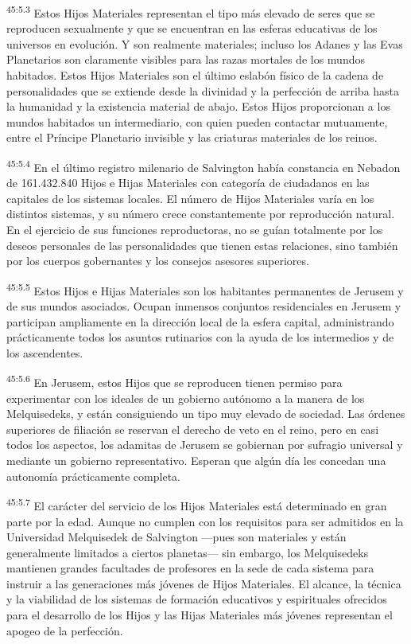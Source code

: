 \par
\textsuperscript{45:5.3} Estos Hijos Materiales representan el tipo más elevado de seres que se reproducen sexualmente y que se encuentran en las esferas educativas de los universos en evolución. Y son realmente materiales; incluso los Adanes y las Evas Planetarios son claramente visibles para las razas mortales de los mundos habitados. Estos Hijos Materiales son el último eslabón físico de la cadena de personalidades que se extiende desde la divinidad y la perfección de arriba hasta la humanidad y la existencia material de abajo. Estos Hijos proporcionan a los mundos habitados un intermediario, con quien pueden contactar mutuamente, entre el Príncipe Planetario invisible y las criaturas materiales de los reinos.

\par
\textsuperscript{45:5.4} En el último registro milenario de Salvington había constancia en Nebadon de 161.432.840 Hijos e Hijas Materiales con categoría de ciudadanos en las capitales de los sistemas locales. El número de Hijos Materiales varía en los distintos sistemas, y su número crece constantemente por reproducción natural. En el ejercicio de sus funciones reproductoras, no se guían totalmente por los deseos personales de las personalidades que tienen estas relaciones, sino también por los cuerpos gobernantes y los consejos asesores superiores.

\par
\textsuperscript{45:5.5} Estos Hijos e Hijas Materiales son los habitantes permanentes de Jerusem y de sus mundos asociados. Ocupan inmensos conjuntos residenciales en Jerusem y participan ampliamente en la dirección local de la esfera capital, administrando prácticamente todos los asuntos rutinarios con la ayuda de los intermedios y de los ascendentes.

\par
\textsuperscript{45:5.6} En Jerusem, estos Hijos que se reproducen tienen permiso para experimentar con los ideales de un gobierno autónomo a la manera de los Melquisedeks, y están consiguiendo un tipo muy elevado de sociedad. Las órdenes superiores de filiación se reservan el derecho de veto en el reino, pero en casi todos los aspectos, los adamitas de Jerusem se gobiernan por sufragio universal y mediante un gobierno representativo. Esperan que algún día les concedan una autonomía prácticamente completa.

\par
\textsuperscript{45:5.7} El carácter del servicio de los Hijos Materiales está determinado en gran parte por la edad. Aunque no cumplen con los requisitos para ser admitidos en la Universidad Melquisedek de Salvington ---pues son materiales y están generalmente limitados a ciertos planetas--- sin embargo, los Melquisedeks mantienen grandes facultades de profesores en la sede de cada sistema para instruir a las generaciones más jóvenes de Hijos Materiales. El alcance, la técnica y la viabilidad de los sistemas de formación educativos y espirituales ofrecidos para el desarrollo de los Hijos y las Hijas Materiales más jóvenes representan el apogeo de la perfección.

